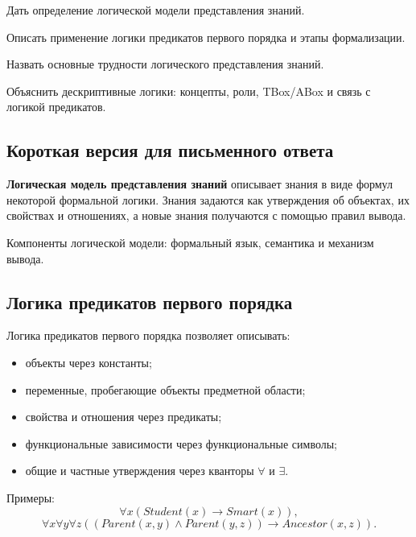 
\begin{examplan}
    \item Дать определение логической модели представления знаний.
    \item Описать применение логики предикатов первого порядка и этапы формализации.
    \item Назвать основные трудности логического представления знаний.
    \item Объяснить дескриптивные логики: концепты, роли, TBox/ABox и связь с логикой предикатов.
\end{examplan}

\subsection*{Короткая версия для письменного ответа}

\textbf{Логическая модель представления знаний} описывает знания в виде формул некоторой формальной логики. Знания задаются как утверждения об объектах, их свойствах и отношениях, а новые знания получаются с помощью правил вывода.

Компоненты логической модели: формальный язык, семантика и механизм вывода.

\subsection*{Логика предикатов первого порядка}

Логика предикатов первого порядка позволяет описывать:
\begin{itemize}
    \item объекты через константы;
    \item переменные, пробегающие объекты предметной области;
    \item свойства и отношения через предикаты;
    \item функциональные зависимости через функциональные символы;
    \item общие и частные утверждения через кванторы $\forall$ и $\exists$.
\end{itemize}

Примеры:
\[
\forall x(Student(x)\to Smart(x)),
\]
\[
\forall x\forall y\forall z((Parent(x,y)\land Parent(y,z))\to Ancestor(x,z)).
\]

